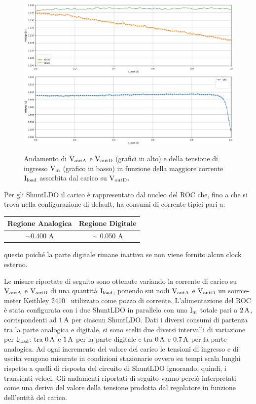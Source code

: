 \begin{figure}
\centering
\includegraphics[width=\textwidth]{Immagini/LoadVDDD}
\includegraphics[width=\textwidth]{Immagini/LoadVIND}
\caption{Andamento di $\mathrm{V_{outA}}$ e $\mathrm{V_{outD}}$ (grafici in alto) e della tensione di ingresso $\mathrm{V_{in}}$ (grafico in basso) in funzione della maggiore corrente $\mathrm{I_{load}}$ assorbita dal carico su $\mathrm{V_{outD}}$.}
\label{LoadVDDD}
\label{LoadVIND}
\end{figure}

Per gli ShuntLDO il carico è rappresentato dal nucleo del ROC che, fino a che si trova nella configurazione di default, ha consumi di corrente tipici pari a:
\begin{center}
\begin{tabular}{cc}
\hline
Regione Analogica & Regione Digitale \\ \hline
$\sim$0.400 A & $\sim$ 0.050 A\\ \hline     
\end{tabular}
\end{center}
questo poiché la parte digitale rimane inattiva se non viene fornito alcun clock esterno.

Le misure riportate di seguito sono ottenute variando la corrente di carico su $\mathrm{V_{outA}}$ e $\mathrm{V_{outD}}$ di una quantit\`a $\mathrm{I_{load}}$, ponendo sui nodi $\mathrm{V_{outA}}$ e $\mathrm{V_{outD}}$ un source-meter Keithley 2410~\cite{2410} utilizzato come pozzo di corrente. L'alimentazione del ROC \`e stata configurata con i due ShuntLDO in parallelo con una $\mathrm{I_{in}}$ totale pari a $2\rm \, A$, corrispondenti ad $1\rm \, A$ per ciascun ShuntLDO. Dati i diversi consumi di partenza tra la parte analogica e digitale, si sono scelti due diversi intervalli di variazione per $\mathrm{I_{load}}$: tra $0\rm \, A$ e $1\rm \, A$ per la parte digitale e tra $0\rm \, A$ e $0.7\rm \, A$ per la parte analogica. Ad ogni incremento del valore del carico le tensioni di ingresso e di uscita vengono misurate in condizioni stazionarie ovvero su tempi scala lunghi rispetto a quelli di risposta del circuito di ShuntLDO ignorando, quindi, i transienti veloci.
Gli andamenti riportati di seguito vanno perciò interpretati come una deriva del valore della tensione prodotta dal regolatore in funzione dell'entità del carico. 

